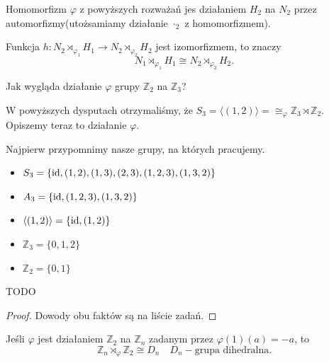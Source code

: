 \begin{fact}
	
		 Homomorfizm $\varphi$ z powyższych rozważań jes działaniem $H_2$ na $N_2$ przez 
			automorfizmy(utożsamiamy działanie $\cdot _{2}$ z homomorfizmem).
\end{fact}
\begin{fact}
		 Funkcja $h: N_2\rtimes_{\varphi_1}H_1 \rightarrow N_2\rtimes_{\varphi_2}H_2$ jest izomorfizmem, to znaczy \[
		 N_1\rtimes_{\varphi_1}H_1 \cong N_2\rtimes_{\varphi_2}H_2
		.\] 
\end{fact}
\begin{question}

	Jak wygląda działanie $\varphi$ grupy $\mathbb{Z}_2$ na $\mathbb{Z}_3$?
\end{question}
W powyższych dysputach otrzymaliśmy, że $S_{3} = \langle \left( 1,2 \right)\rangle = \cong_{\varphi} \mathbb{Z}_3 \rtimes \mathbb{Z}_2$. Opiszemy teraz to działanie $\varphi$.

Najpierw przypomnimy nasze grupy, na których pracujemy.
\begin{itemize}
	\item $S_{3} = \{\operatorname{id}, (1,2), (1,3), (2,3), (1,2,3), (1,3,2)\} $ 
	\item $A_3 = \{\operatorname{id}, (1,2,3), (1,3,2)\} $
	\item $\langle (1,2) \rangle = \{\operatorname{id}, (1,2)\} $
	\item $\mathbb{Z}_3 = \{0,1,2\} $ 
	\item $\mathbb{Z}_2 = \{0,1\} $
\end{itemize}
TODO
\begin{proof}

	Dowody obu faktów są na liście zadań.
\end{proof}
\begin{theorem}

	Jeśli $\varphi$ jest działaniem $\mathbb{Z}_2$ na $\mathbb{Z}_{n}$ zadanym przez $\varphi\left( 1 \right) \left( a \right) = -a$, to \[
	\mathbb{Z}_{n}\rtimes_{\varphi} \mathbb{Z}_2 \cong D_{n} \quad D_{n}-\text{grupa dihedralna}
	.\] 	
\end{theorem}

